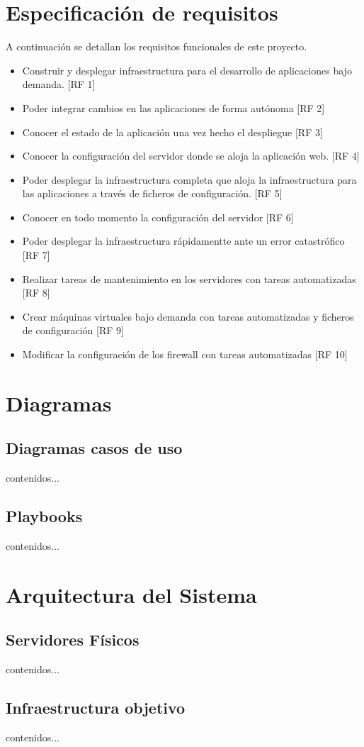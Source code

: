 \section{Especificación de requisitos}
	\begin{paragraph}
		A continuación se detallan los requisitos funcionales de este proyecto. 
		\begin{itemize}
			\item Construir y desplegar infraestructura para el desarrollo de aplicaciones bajo demanda. [RF 1]
			\item Poder integrar cambios en las aplicaciones de forma autónoma [RF 2]
			\item Conocer el estado de la aplicación una vez hecho el despliegue [RF 3]
			\item Conocer la configuración del servidor donde se aloja la aplicación web. [RF 4]
			\item Poder desplegar la infraestructura completa que aloja la infraestructura para las aplicaciones a través de ficheros de configuración. [RF 5]
			\item Conocer en todo momento la configuración del servidor [RF 6]
			\item Poder desplegar la infraestructura rápidamentte ante un error catastrófico [RF 7]
			\item Realizar tareas de mantenimiento en los servidores con tareas automatizadas [RF 8]
			\item Crear máquinas virtuales bajo demanda con tareas automatizadas y ficheros de configuración [RF 9]
			\item Modificar la configuración de los firewall con tareas automatizadas [RF 10]
		\end{itemize}
	\end{paragraph}

\section{Diagramas}
	\subsection{Diagramas casos de uso}
		\begin{paragraph}
			contenidos...
		\end{paragraph}
	\subsection{Playbooks}
		\begin{paragraph}
		contenidos...
		\end{paragraph}
\section{Arquitectura del Sistema}
	\subsection{Servidores Físicos}
		\begin{paragraph}
			contenidos...
		\end{paragraph}
	\subsection{Infraestructura objetivo}
		\begin{paragraph}
			contenidos...
		\end{paragraph}